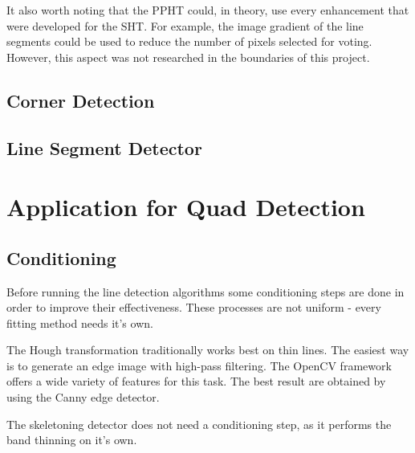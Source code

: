 It also worth noting that the PPHT could, in theory, use every enhancement that were developed for the SHT.
For example, the image gradient of the line segments could be used to reduce the number of pixels selected for voting.
However, this aspect was not researched in the boundaries of this project.

\subsection{Corner Detection}


\subsection{Line Segment Detector}

\section{Application for Quad Detection}


\subsection{Conditioning}

Before running the line detection algorithms some conditioning steps are done in order to improve their effectiveness.
These processes are not uniform - every fitting method needs it's own.

The Hough transformation traditionally works best on thin lines.
The easiest way is to generate an edge image with high-pass filtering.
The OpenCV framework offers a wide variety of features for this task.
The best result are obtained by using the Canny edge detector.

The skeletoning detector does not need a conditioning step, as it performs the band thinning on it's own.

